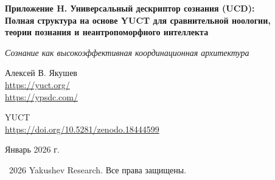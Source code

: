 \documentclass[12pt,a4paper]{article}
\DeclareRobustCommand{\alD}{\texorpdfstring{\ensuremath{\alpha_{\mathrm{D}}}}{alpha_D}}
\DeclareRobustCommand{\beI}{\texorpdfstring{\ensuremath{\beta_{\mathrm{I}}}}{beta_I}}
\DeclareRobustCommand{\gaR}{\texorpdfstring{\ensuremath{\gamma_{\mathrm{R}}}}{gamma_R}}
\newcommand{\eff}{\mathrm{eff}}
\newcommand{\Ke}{K_{\eff}}
\begin{document}
	
	\begin{titlepage}
		\begin{center}
			\vspace*{0cm}
			
			\Huge\textbf{Приложение H. Универсальный дескриптор сознания (UCD):\\ Полная структура на основе YUCT для сравнительной ноологии,\\ теории познания и неантропоморфного интеллекта}
			
			\vspace{1cm}
			
			\small\textit{Сознание как высокоэффективная координационная архитектура}
			
			\vspace{1cm}
			\Large
			Алексей В. Якушев\\
			
			\url{https://yuct.org/}\\
			\url{https://ypsdc.com/}
			
			\vspace{2cm}
			\large YUCT \\ 
			\url{https://doi.org/10.5281/zenodo.18444599}\\
			\vspace{1cm}
			
			\vspace{0cm}
			\large
			Январь 2026 г.
			
			\vspace{6cm}
			\textcopyright~2026 Yakushev Research. Все права защищены.
			
			\newpage
			
			\begin{abstract}
				\noindent
				В этой статье представлена полная унифицированная структура «Сознание-Знание», объединяющая Универсальный дескриптор сознания (UCD) с Объединяющей теорией координации Якушева (YUCT). Основываясь на фундаментальном понимании того, что сознание/интеллект/разум — это высокоэффективная (\(\Ke \gg 1\)) координационная архитектура, мы развиваем: (1) Полную математическую формулировку триады D+I\(\cdot\)R как фундаментального разложения любого когнитивного агента; (2) Три спектральных параметра (\alD, \beI, \gaR) для количественного сравнения различных видов и субстратов; (3) Теорию познания как координированной обработки информации; (4) Детальные экспериментальные протоколы для измерения сознания в биологических, искусственных и внеземных системах; (5) Конкретные предсказания для астрофизического поиска SETI 2.0; (6) Сравнение с существующими теориями сознания (IIT, глобальное рабочее пространство, предсказательное кодирование); (7) Этические импликации и практические применения в медицине, безопасности ИИ и кибербезопасности; (8) Полные математические доказательства, включая теоремы о когнитивной иерархии, верхних пределах эффективности координации и границах вычислительной сложности. Предлагаемая структура разрешает давние философские проблемы, предоставляя проверяемые предсказания в более чем 15 экспериментальных областях.
			\end{abstract}
			

\end{center}
\end{titlepage}
\end{document}
